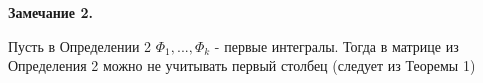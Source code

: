 \documentclass[12pt, a4paper]{report}
\begin{document}
    \textbf{Замечание 2.}
    
    Пусть в Определении 2 \( \Phi_1, ...,\Phi_k \) - первые интегралы. Тогда в матрице из Определения 2 можно не учитывать первый столбец (следует из Теоремы 1)

    




\ifdefined\mainfile
\else
    
\end{document}
